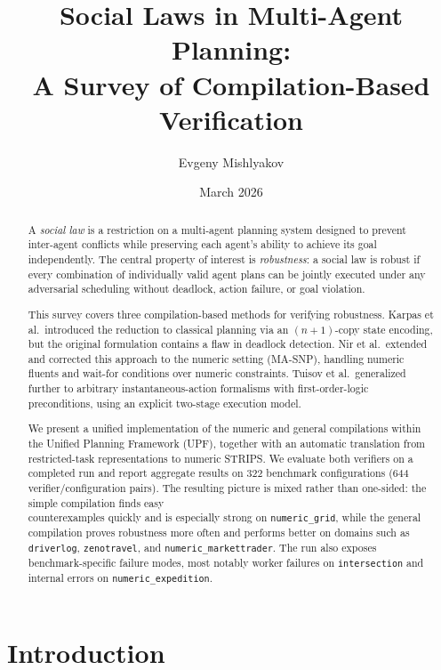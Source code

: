 \documentclass{article}
\title{Social Laws in Multi-Agent Planning:\\A Survey of Compilation-Based Verification}
\author{Evgeny Mishlyakov}
\date{March 2026}
\theoremstyle{definition}
\begin{document}
\maketitle

\begin{abstract}
A \emph{social law} is a restriction on a multi-agent planning system designed to prevent inter-agent conflicts while preserving each agent's ability to achieve its goal independently. The central property of interest is \emph{robustness}: a social law is robust if every combination of individually valid agent plans can be jointly executed under any adversarial scheduling without deadlock, action failure, or goal violation.

This survey covers three compilation-based methods for verifying robustness. Karpas et al.\ introduced the reduction to classical planning via an $(n+1)$-copy state encoding, but the original formulation contains a flaw in deadlock detection. Nir et al.\ extended and corrected this approach to the numeric setting (MA-SNP), handling numeric fluents and wait-for conditions over numeric constraints. Tuisov et al.\ generalized further to arbitrary instantaneous-action formalisms with first-order-logic preconditions, using an explicit two-stage execution model.

We present a unified implementation of the numeric and general compilations within the Unified Planning Framework (UPF), together with an automatic translation from restricted-task representations to numeric STRIPS. We evaluate both verifiers on a completed run and report aggregate results on 322 benchmark configurations (644 verifier/configuration pairs). The resulting picture is mixed rather than one-sided: the simple compilation finds easy\\
 counterexamples quickly and is especially strong on \texttt{numeric\_grid}, while the general compilation proves robustness more often and performs better on domains such as \texttt{driverlog}, \texttt{zenotravel}, and \texttt{numeric\_markettrader}. The run also exposes benchmark-specific failure modes, most notably worker failures on \texttt{intersection} and internal errors on \texttt{numeric\_expedition}.
\end{abstract}

\section{Introduction}
\end{document}

